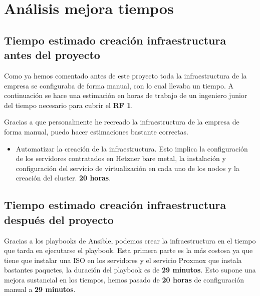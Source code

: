 \section{Análisis mejora tiempos}
\label{analisis_tiempos} 
\subsection{Tiempo estimado creación infraestructura antes del proyecto}
\begin{text}
        Como ya hemos comentado antes de este proyecto toda la infraestructura de la empresa se configuraba de forma manual, con lo cual llevaba un tiempo. A continuación se hace una estimación en horas de trabajo de un ingeniero junior del tiempo necesario para cubrir el \textbf{RF 1}.

        Gracias a que personalmente he recreado la infraestructura de la empresa de forma manual, puedo hacer estimaciones bastante correctas.

        \begin{itemize}
                \item Automatizar la creación de la infraestructura. Esto implica la configuración de los servidores contratados en Hetzner bare metal, la instalación y configuración del servicio de virtualización en cada uno de los nodos y la creación del cluster.  \textbf{20 horas}.
        \end{itemize}


\end{text}

\subsection{Tiempo estimado creación infraestructura después del proyecto}
\begin{text}
        Gracias a los playbooks de Ansible, podemos crear la infraestructura en el tiempo que tarda en ejecutarse el playbook. Esta primera parte es la más costosa ya que tiene que instalar una ISO en los servidores y el servicio Proxmox que instala bastantes paquetes, la duración del playbook es de \textbf{29 minutos}. Esto supone una mejora sustancial en los tiempos, hemos pasado de \textbf{20 horas} de configuración manual a \textbf{29 minutos}.
\end{text}

